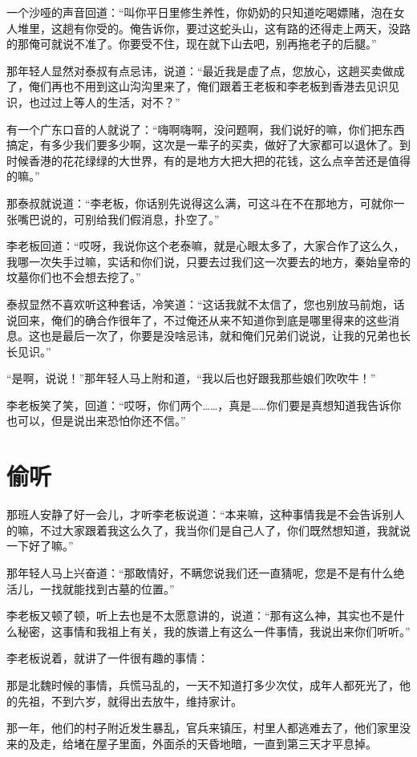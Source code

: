 一个沙哑的声音回道：“叫你平日里修生养性，你奶奶的只知道吃喝嫖赌，泡在女人堆里，这趟有你受的。俺告诉你，要过这蛇头山，这有路的还得走上两天，没路的那俺可就说不准了。你要受不住，现在就下山去吧，别再拖老子的后腿。”

那年轻人显然对泰叔有点忌讳，说道：“最近我是虚了点，您放心，这趟买卖做成了，俺们再也不用到这山沟沟里来了，俺们跟着王老板和李老板到香港去见识见识，也过过上等人的生活，对不？”

有一个广东口音的人就说了：“嗨啊嗨啊，没问题啊，我们说好的嘛，你们把东西搞定，有多少我们要多少啊，这次是一辈子的买卖，做好了大家都可以退休了。到时候香港的花花绿绿的大世界，有的是地方大把大把的花钱，这么点辛苦还是值得的嘛。”

那泰叔就说道：“李老板，你话别先说得这么满，可这斗在不在那地方，可就你一张嘴巴说的，可别给我们假消息，扑空了。”

李老板回道：“哎呀，我说你这个老泰嘛，就是心眼太多了，大家合作了这么久，我哪一次失手过嘛，实话和你们说，只要去过我们这一次要去的地方，秦始皇帝的坟墓你们也不会想去挖了。”

泰叔显然不喜欢听这种套话，冷笑道：“这话我就不太信了，您也别放马前炮，话说回来，俺们的确合作很年了，不过俺还从来不知道你到底是哪里得来的这些消息。这也是最后一次了，你要是没啥忌讳，就和俺们兄弟们说说，让我的兄弟也长长见识。”

“是啊，说说！”那年轻人马上附和道，“我以后也好跟我那些娘们吹吹牛！”

李老板笑了笑，回道：“哎呀，你们两个……，真是……你们要是真想知道我告诉你也可以，但是说出来恐怕你还不信。”

\chapter{偷听}

那班人安静了好一会儿，才听李老板说道：“本来嘛，这种事情我是不会告诉别人的嘛，不过大家跟着我这么久了，我当你们是自己人了，你们既然想知道，我就说一下好了嘛。”

那年轻人马上兴奋道：“那敢情好，不瞒您说我们还一直猜呢，您是不是有什么绝活儿，一找就能找到古墓的位置。”

李老板又顿了顿，听上去也是不太愿意讲的，说道：“那有这么神，其实也不是什么秘密，这事情和我祖上有关，我的族谱上有这么一件事情，我说出来你们听听。”

李老板说着，就讲了一件很有趣的事情：

那是北魏时候的事情，兵慌马乱的，一天不知道打多少次仗，成年人都死光了，他的先祖，不到六岁，就得出去放牛，维持家计。

那一年，他们的村子附近发生暴乱，官兵来镇压，村里人都逃难去了，他们家里没来的及走，给堵在屋子里面，外面杀的天昏地暗，一直到第三天才平息掉。

